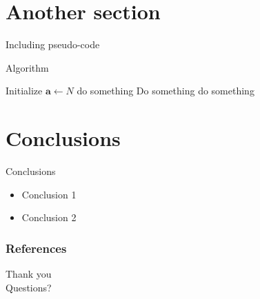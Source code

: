 \documentclass[10pt]{beamer}
\newcommand{\nologo}{\setbeamertemplate{logo}{}} %
\begin{document}
\section{Another section}

\begin{frame}[fragile]{Including pseudo-code}

\begin{algorithm}[H]
    \caption{Algorithm}\label{algorithmLabel}
    \begin{algorithmic}[1]
        \State Initialize
        \State $\mathbf{a} \gets N$ do something
            \State Do something
                \State do something
            \EndIf
        \EndWhile
    \end{algorithmic}
\end{algorithm}

\end{frame}

\section{Conclusions}
\begin{frame}[fragile]{Conclusions}

    \begin{itemize}
        \item Conclusion 1 \cite{Murata}
        \pause
        \item Conclusion 2
    \end{itemize}
\end{frame}


{\nologo
\begin{frame}[allowframebreaks]
        \frametitle{References}
        
        
\end{frame}

\begin{frame}[standout]
  Thank you \\ Questions?
\end{frame}
}
\end{document}
